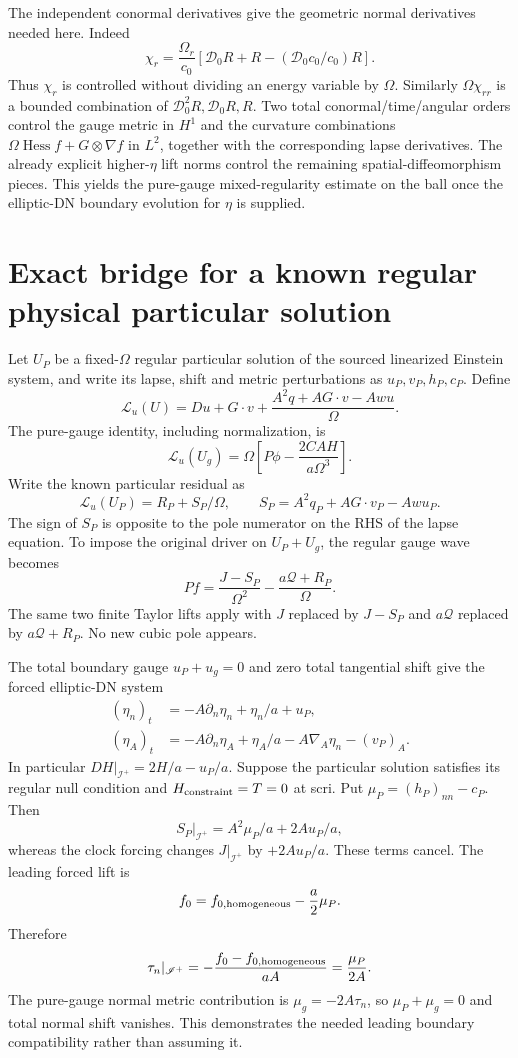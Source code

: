 \documentclass[11pt]{article}
\newcommand{\scri}{\mathscr I^+}
\begin{document}
The independent conormal derivatives give the geometric normal derivatives needed here. Indeed
\[
 \chi_r=\frac{\Omega_r}{c_0}
 \left[\mathcal D_0R+R-(\mathcal D_0c_0/c_0)R\right].
\]
Thus $\chi_r$ is controlled without dividing an energy variable by $\Omega$. Similarly $\Omega\chi_{rr}$ is a bounded combination of $\mathcal D_0^2R,\mathcal D_0R,R$. Two total conormal/time/angular orders control the gauge metric in $H^1$ and the curvature combinations $\Omega\operatorname{Hess}f+G\otimes\nabla f$ in $L^2$, together with the corresponding lapse derivatives. The already explicit higher-$\eta$ lift norms control the remaining spatial-diffeomorphism pieces. This yields the pure-gauge mixed-regularity estimate on the ball once the elliptic-DN boundary evolution for $\eta$ is supplied.

\section{Exact bridge for a known regular physical particular solution}
Let $U_P$ be a fixed-$\Omega$ regular particular solution of the sourced linearized Einstein system, and write its lapse, shift and metric perturbations as $u_P,v_P,h_P,c_P$. Define
\[
 \mathcal L_u(U)=Du+G\cdot v+
 \frac{A^2q+AG\cdot v-Awu}{\Omega}.
\]
The pure-gauge identity, including normalization, is
\[
 \mathcal L_u(U_g)=\Omega\left[P\phi-\frac{2CAH}{a\Omega^3}\right].
\]
Write the known particular residual as
\[
 \mathcal L_u(U_P)=R_P+S_P/\Omega,
 \qquad S_P=A^2q_P+AG\cdot v_P-Awu_P.
\]
The sign of $S_P$ is opposite to the pole numerator on the RHS of the lapse equation. To impose the original driver on $U_P+U_g$, the regular gauge wave becomes
\[
 Pf=\frac{J-S_P}{\Omega^2}-\frac{a\mathcal Q+R_P}{\Omega}.
\]
The same two finite Taylor lifts apply with $J$ replaced by $J-S_P$ and $a\mathcal Q$ replaced by $a\mathcal Q+R_P$. No new cubic pole appears.

The total boundary gauge $u_P+u_g=0$ and zero total tangential shift give the forced elliptic-DN system
\begin{align}
 (\eta_n)_t&=-A\partial_n\eta_n+\eta_n/a+u_P,\\
 (\eta_A)_t&=-A\partial_n\eta_A+\eta_A/a-A\nabla_A\eta_n-(v_P)_A.
\end{align}
In particular $DH|_{\scri}=2H/a-u_P/a$. Suppose the particular solution satisfies its regular null condition and $H_{\rm constraint}=T=0$ at scri. Put $\mu_P=(h_P)_{nn}-c_P$. Then
\[
 S_P|_{\scri}=A^2\mu_P/a+2Au_P/a,
\]
whereas the clock forcing changes $J|_{\scri}$ by $+2Au_P/a$. These terms cancel. The leading forced lift is
\[
 f_0=f_{0,\rm homogeneous}-\frac a2\mu_P.
\]
Therefore
\[
 \tau_n|_{\scri}=-\frac{f_0-f_{0,\rm homogeneous}}{aA}
 =\frac{\mu_P}{2A}.
\]
The pure-gauge normal metric contribution is $\mu_g=-2A\tau_n$, so $\mu_P+\mu_g=0$ and total normal shift vanishes. This demonstrates the needed leading boundary compatibility rather than assuming it.
\end{document}
